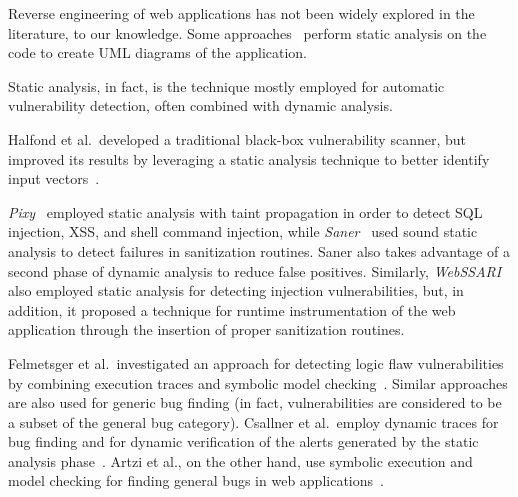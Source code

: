 %
%
%
%

Reverse engineering of web applications has not been widely explored
in the literature, to our knowledge. Some approaches~\cite{di02:ware}
perform static analysis on the code to create UML diagrams of the
application.

Static analysis, in fact, is the technique mostly employed for
automatic vulnerability detection, often combined with dynamic
analysis.

Halfond et al.\ developed a traditional black-box vulnerability
scanner, but improved its results by leveraging a static analysis
technique to better identify input
vectors~\cite{halfond09:penetration}.

\emph{Pixy}~\cite{jovanovic10:static} employed static analysis with
taint propagation in order to detect SQL injection, XSS, and shell
command injection, while \emph{Saner}~\cite{balzarotti08:saner} used
sound static analysis to detect failures in sanitization routines.
Saner also takes advantage of a second phase of dynamic analysis to
reduce false positives. Similarly,
\emph{WebSSARI}~\cite{huang04:securing} also employed static analysis
for detecting injection vulnerabilities, but, in addition, it proposed
a technique for runtime instrumentation of the web application through
the insertion of proper sanitization routines.

Felmetsger et al.\ investigated an approach for detecting logic flaw
vulnerabilities by combining execution traces and symbolic model
checking~\cite{felmetsger10:logic}. Similar approaches are also used
for generic bug finding (in fact, vulnerabilities are considered to be
a subset of the general bug category). Csallner et al.\ employ dynamic
traces for bug finding and for dynamic verification of the alerts
generated by the static analysis phase~\cite{csallner08:dsd}. Artzi et
al., on the other hand, use symbolic execution and model checking for
finding general bugs in web applications~\cite{artzi10:finding}.

